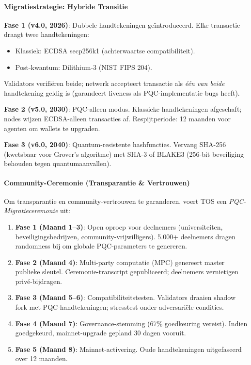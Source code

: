 \documentclass[11pt]{article}
\begin{document}
\paragraph{Migratiestrategie: Hybride Transitie}
\textbf{Fase 1 (v4.0, 2026)}: Dubbele handtekeningen geïntroduceerd. Elke transactie draagt twee handtekeningen:
\begin{itemize}[noitemsep]
  \item Klassiek: ECDSA secp256k1 (achterwaartse compatibiliteit).
  \item Post-kwantum: Dilithium-3 (NIST FIPS 204).
\end{itemize}
Validators verifiëren beide; netwerk accepteert transactie als \emph{één van beide} handtekening geldig is (garandeert liveness als PQC-implementatie bugs heeft).

\textbf{Fase 2 (v5.0, 2030)}: PQC-alleen modus. Klassieke handtekeningen afgeschaft; nodes wijzen ECDSA-alleen transacties af. Respijtperiode: 12 maanden voor agenten om wallets te upgraden.

\textbf{Fase 3 (v6.0, 2040)}: Quantum-resistente hashfuncties. Vervang SHA-256 (kwetsbaar voor Grover's algoritme) met SHA-3 of BLAKE3 (256-bit beveiliging behouden tegen quantumaanvallen).

\paragraph{Community-Ceremonie (Transparantie \& Vertrouwen)}
Om transparantie en community-vertrouwen te garanderen, voert TOS een \emph{PQC-Migratieceremonie} uit:
\begin{enumerate}[noitemsep]
  \item \textbf{Fase 1 (Maand 1--3)}: Open oproep voor deelnemers (universiteiten, beveiligingsbedrijven, community-vrijwilligers). 5.000+ deelnemers dragen randomness bij om globale PQC-parameters te genereren.
  \item \textbf{Fase 2 (Maand 4)}: Multi-party computatie (MPC) genereert master publieke sleutel. Ceremonie-transcript gepubliceerd; deelnemers vernietigen privé-bijdragen.
  \item \textbf{Fase 3 (Maand 5--6)}: Compatibiliteitstesten. Validators draaien shadow fork met PQC-handtekeningen; stresstest onder adversariële condities.
  \item \textbf{Fase 4 (Maand 7)}: Governance-stemming (67\% goedkeuring vereist). Indien goedgekeurd, mainnet-upgrade gepland 30 dagen vooruit.
  \item \textbf{Fase 5 (Maand 8)}: Mainnet-activering. Oude handtekeningen uitgefaseerd over 12 maanden.
\end{enumerate}
\end{document}
